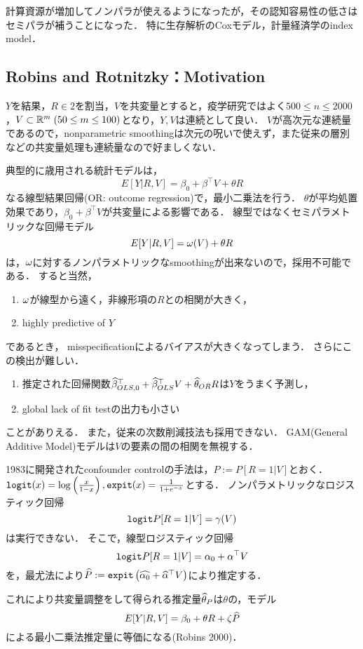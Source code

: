 \documentclass[uplatex,dvipdfmx]{jsreport}
\begin{document}
計算資源が増加してノンパラが使えるようになったが，その認知容易性の低さはセミパラが補うことになった．
特に生存解析のCoxモデル，計量経済学のindex model．

\subsection{Robins and Rotnitzky：Motivation}

\begin{notation}
    $Y$を結果，$R\in2$を割当，$V$を共変量とすると，疫学研究ではよく$500\le n\le 2000$，$V\subset\mathbb{R}^m\;(50\le m\le 100)$となり，$Y,V$は連続として良い．
$V$が高次元な連続量であるので，nonparametric smoothingは次元の呪いで使えず，また従来の層別などの共変量処理も連続量なので好ましくない．
\end{notation}

\begin{example}
    典型的に歳用される統計モデルは，
    \[E[Y|R,V]=\beta_0+\beta^\top V+\theta R\]
    なる線型結果回帰(OR: outcome regression)で，最小二乗法を行う．
    $\theta$が平均処置効果であり，$\beta_0+\beta^\top V$が共変量による影響である．
    線型ではなくセミパラメトリックな回帰モデル
    \[E[Y|R,V]=\omega(V)+\theta R\]
    は，$\omega$に対するノンパラメトリックなsmoothingが出来ないので，採用不可能である．
    すると当然，
    \begin{enumerate}
        \item $\omega$が線型から遠く，非線形項の$R$との相関が大きく，
        \item highly predictive of $Y$
    \end{enumerate}
    であるとき，
    misspecificationによるバイアスが大きくなってしまう．
    さらにこの検出が難しい．
    \begin{enumerate}
        \item 推定された回帰関数$\widehat{\beta}_{OLS,0}^\top+\widehat{\beta}_{OLS}^\top V+\widehat{\theta}_{OR}R$は$Y$をうまく予測し，
        \item global lack of fit testの出力も小さい
    \end{enumerate}
    ことがありえる．
    また，従来の次数削減技法も採用できない．
    GAM(General Additive Model)モデルは$V$の要素の間の相関を無視する．
\end{example}

\begin{example}
    1983に開発されたconfounder controlの手法は，$P:=P[R=1|V]$とおく．
    $\mathtt{logit} (x)=\log\left(\frac{x}{1-x}\right),\mathtt{expit}(x)=\frac{1}{1+e^{-x}}$とする．
    ノンパラメトリックなロジスティック回帰
    \[\mathtt{logit} P[R=1|V]=\gamma(V)\]
    は実行できない．
    そこで，線型ロジスティック回帰
    \[\mathtt{logit} P[R=1|V]=\alpha_0+\alpha^\top V\]
    を，最尤法により$\widehat{P}:=\mathtt{expit}\left(\widehat{\alpha_0}+\widehat{\alpha}^\top V\right)$により推定する．

    これにより共変量調整をして得られる推定量$\widehat{\theta}_P$は$\theta$の，モデル
    \[E[Y|R,V]=\beta_0+\theta R+\zeta\widehat{P}\]
    による最小二乗法推定量に等価になる(Robins 2000)．
\end{example}
\end{document}
